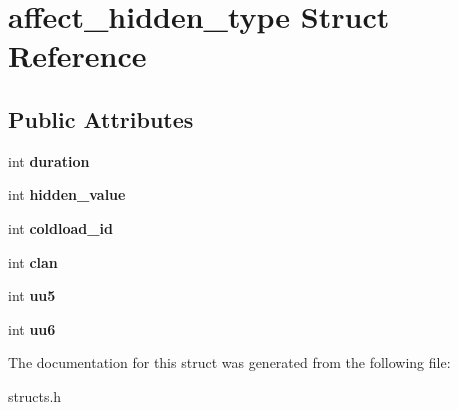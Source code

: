 \hypertarget{structaffect__hidden__type}{\section{affect\-\_\-hidden\-\_\-type Struct Reference}
\label{structaffect__hidden__type}
}
\subsection*{Public Attributes}
\begin{DoxyCompactItemize}
\item 
\hypertarget{structaffect__hidden__type_a9ef7b18231870dde85d45304f785b33a}{int {\bfseries duration}}\label{structaffect__hidden__type_a9ef7b18231870dde85d45304f785b33a}

\item 
\hypertarget{structaffect__hidden__type_aa38b96b89c5510a33fe69c317105bfd9}{int {\bfseries hidden\-\_\-value}}\label{structaffect__hidden__type_aa38b96b89c5510a33fe69c317105bfd9}

\item 
\hypertarget{structaffect__hidden__type_af665303631d1d9e99e25b68ccb19a7c8}{int {\bfseries coldload\-\_\-id}}\label{structaffect__hidden__type_af665303631d1d9e99e25b68ccb19a7c8}

\item 
\hypertarget{structaffect__hidden__type_ad041ea2b0b58b321c6d321fc33ac745f}{int {\bfseries clan}}\label{structaffect__hidden__type_ad041ea2b0b58b321c6d321fc33ac745f}

\item 
\hypertarget{structaffect__hidden__type_ae3f77e549637b130342f6a17fd66943b}{int {\bfseries uu5}}\label{structaffect__hidden__type_ae3f77e549637b130342f6a17fd66943b}

\item 
\hypertarget{structaffect__hidden__type_a80680a001f067f146110fa86d4127571}{int {\bfseries uu6}}\label{structaffect__hidden__type_a80680a001f067f146110fa86d4127571}

\end{DoxyCompactItemize}


The documentation for this struct was generated from the following file\-:\begin{DoxyCompactItemize}
\item 
structs.\-h\end{DoxyCompactItemize}
